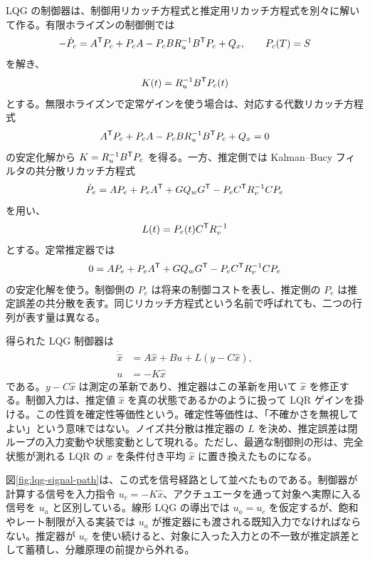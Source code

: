 LQG の制御器は、制御用リカッチ方程式と推定用リカッチ方程式を別々に解いて作る。有限ホライズンの制御側では
\begin{equation}
  -\dot{P}_c
  =
  A^{\mathsf{T}} P_c+P_cA-P_cBR_u^{-1}B^{\mathsf{T}} P_c+Q_x,
  \qquad
  P_c(T)=S
  \label{eq:lqg-control-rde}
\end{equation}
を解き、
\begin{equation}
  K(t)=R_u^{-1}B^{\mathsf{T}} P_c(t)
  \label{eq:lqg-control-gain}
\end{equation}
とする。無限ホライズンで定常ゲインを使う場合は、対応する代数リカッチ方程式
\begin{equation}
  A^{\mathsf{T}} P_c+P_cA-P_cBR_u^{-1}B^{\mathsf{T}} P_c+Q_x=0
  \label{eq:lqg-control-care}
\end{equation}
の安定化解から $K=R_u^{-1}B^{\mathsf{T}} P_c$ を得る。一方、推定側では Kalman--Bucy フィルタの共分散リカッチ方程式
\begin{equation}
  \dot{P}_e
  =
  AP_e+P_eA^{\mathsf{T}}+GQ_wG^{\mathsf{T}}
  -P_eC^{\mathsf{T}} R_v^{-1}CP_e
  \label{eq:lqg-estimator-rde}
\end{equation}
を用い、
\begin{equation}
  L(t)=P_e(t)C^{\mathsf{T}} R_v^{-1}
  \label{eq:lqg-estimator-gain}
\end{equation}
とする。定常推定器では
\begin{equation}
  0=
  AP_e+P_eA^{\mathsf{T}}+GQ_wG^{\mathsf{T}}
  -P_eC^{\mathsf{T}} R_v^{-1}CP_e
  \label{eq:lqg-estimator-care}
\end{equation}
の安定化解を使う。制御側の $P_c$ は将来の制御コストを表し、推定側の $P_e$ は推定誤差の共分散を表す。同じリカッチ方程式という名前で呼ばれても、二つの行列が表す量は異なる。

得られた LQG 制御器は
\begin{align}
  \dot{\hat{x}}&=A\hat{x}+Bu+L(y-C\hat{x}),\\
  u&=-K\hat{x}
  \label{eq:lqg-controller}
\end{align}
である。$y-C\hat{x}$ は測定の革新であり、推定器はこの革新を用いて $\hat{x}$ を修正する。制御入力は、推定値 $\hat{x}$ を真の状態であるかのように扱って LQR ゲインを掛ける。この性質を確定性等価性という。確定性等価性は、「不確かさを無視してよい」という意味ではない。ノイズ共分散は推定器の $L$ を決め、推定誤差は閉ループの入力変動や状態変動として現れる。ただし、最適な制御則の形は、完全状態が測れる LQR の $x$ を条件付き平均 $\hat{x}$ に置き換えたものになる。

図\ref{fig:lqg-signal-path}は、この式を信号経路として並べたものである。制御器が計算する信号を入力指令 $u_c=-K\hat{x}$、アクチュエータを通って対象へ実際に入る信号を $u_a$ と区別している。線形 LQG の導出では $u_a=u_c$ を仮定するが、飽和やレート制限が入る実装では $u_a$ が推定器にも渡される既知入力でなければならない。推定器が $u_c$ を使い続けると、対象に入った入力との不一致が推定誤差として蓄積し、分離原理の前提から外れる。


